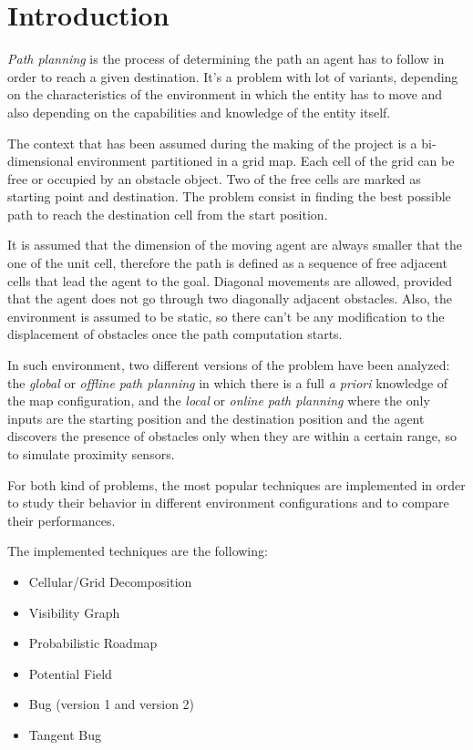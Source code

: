 \documentclass[conference]{IEEEtran}
\begin{document}
\section{Introduction}
\emph{Path planning} is the process of determining the path an agent has to follow in order to reach a given destination. It's a problem with lot of variants, depending on the characteristics of the environment in which the entity has to move and also depending on the capabilities and knowledge of the entity itself.

The context that has been assumed during the making of the project is a bi-dimensional environment partitioned in a grid map. Each cell of the grid can be free or occupied by an obstacle object. Two of the free cells are marked as starting point and destination. The problem consist in finding the best possible path to reach the destination cell from the start position.

It is assumed that the dimension of the moving agent are always smaller that the one of the unit cell, therefore the path is defined as a sequence of free adjacent cells that lead the agent to the goal. Diagonal movements are allowed, provided that the agent does not go through two diagonally adjacent obstacles. Also, the environment is assumed to be static, so there can't be any modification to the displacement of obstacles once the path computation starts.

In such environment, two different versions of the problem have been analyzed: the \emph{global} or \emph{offline path planning} in which there is a full \emph{a priori} knowledge of the map configuration, and the \emph{local} or \emph{online path planning} where the only inputs are the starting position and the destination position and the agent discovers the presence of obstacles only when they are within a certain range, so to simulate proximity sensors.

For both kind of problems, the most popular techniques are implemented in order to study their behavior in different environment configurations and to compare their performances.

The implemented techniques are the following:
\begin{itemize}
	\item Cellular/Grid Decomposition
	\item Visibility Graph
	\item Probabilistic Roadmap
	\item Potential Field
	\item Bug (version 1 and version 2)
	\item Tangent Bug
\end{itemize}
\end{document}
